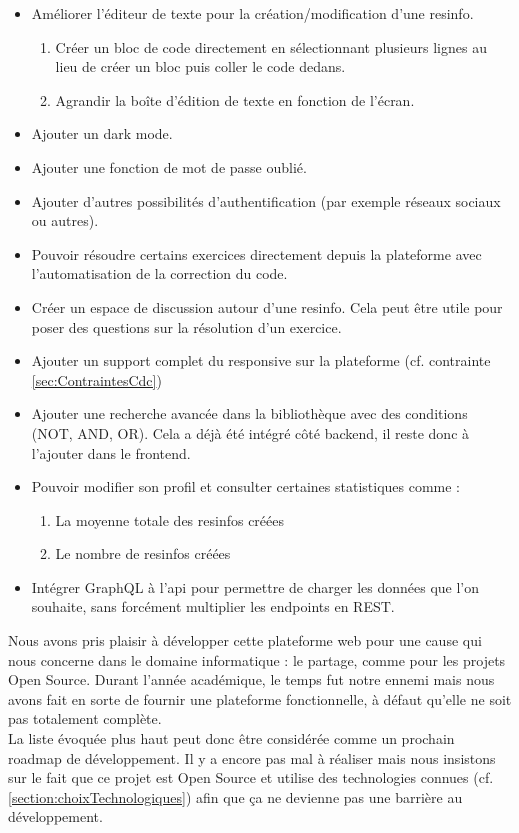 \begin{itemize}
    \item Améliorer l'éditeur de texte pour la création/modification d'une \gls{resinfo}.
    \begin{enumerate}
        \item Créer un bloc de code directement en sélectionnant plusieurs lignes au lieu de créer un bloc puis coller le code dedans.
        \item Agrandir la boîte d'édition de texte en fonction de l'écran.
    \end{enumerate}
    \item Ajouter un dark mode.
    \item Ajouter une fonction de mot de passe oublié.
    \item Ajouter d'autres possibilités d'authentification (par exemple réseaux sociaux ou autres).
    \item Pouvoir résoudre certains exercices directement depuis la plateforme avec l'automatisation de la correction du code.
    \item Créer un espace de discussion autour d'une \gls{resinfo}. Cela peut être utile pour poser des questions sur la résolution d'un exercice.
    \item Ajouter un support complet du responsive sur la plateforme (cf. contrainte \ref{sec:ContraintesCdc})
    \item Ajouter une recherche avancée dans la bibliothèque avec des conditions (NOT, AND, OR). Cela a déjà été intégré côté \gls{backend}, il reste donc à l'ajouter dans le \gls{frontend}.
    \item Pouvoir modifier son profil et consulter certaines statistiques comme :
    \begin{enumerate}
        \item La moyenne totale des \glspl{resinfo} créées
        \item Le nombre de \glspl{resinfo} créées
    \end{enumerate}
    \item Intégrer GraphQL à l'\gls{api} pour permettre de charger les données que l'on souhaite, sans forcément multiplier les endpoints en REST.
\end{itemize}

Nous avons pris plaisir à développer cette plateforme web pour une cause qui nous concerne dans le domaine informatique : le partage, comme pour les projets Open Source. Durant l'année académique, le temps fut notre ennemi mais nous avons fait en sorte de fournir une plateforme fonctionnelle, à défaut qu'elle ne soit pas totalement complète.\\

La liste évoquée plus haut peut donc être considérée comme un prochain roadmap de développement. Il y a encore pas mal à réaliser mais nous insistons sur le fait que ce projet est Open Source et utilise des technologies connues (cf. \ref{section:choixTechnologiques}) afin que ça ne devienne pas une barrière au développement.